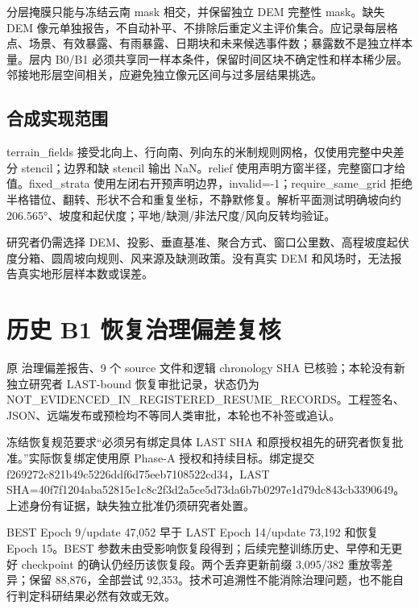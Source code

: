 \documentclass[UTF8,a4paper,10pt,fontset=fandol]{ctexart}
\begin{document}
分层掩膜只能与冻结云南 mask 相交，并保留独立 DEM 完整性 mask。缺失 DEM 像元单独报告，不自动补平、不排除后重定义主评价集合。应记录每层格点、场景、有效暴露、有雨暴露、日期块和未来候选事件数；暴露数不是独立样本量。层内 B0/B1 必须共享同一样本条件，保留时间区块不确定性和样本稀少层。邻接地形层空间相关，应避免独立像元区间与过多层结果挑选。\par

\subsection*{合成实现范围}

terrain\_fields 接受北向上、行向南、列向东的米制规则网格，仅使用完整中央差分 stencil；边界和缺 stencil 输出 NaN。relief 使用声明方窗半径，完整窗口才给值。fixed\_strata 使用左闭右开预声明边界，invalid=-1；require\_same\_grid 拒绝半格错位、翻转、形状不合和重复坐标，不静默修复。解析平面测试明确坡向约 206.565°、坡度和起伏度；平地/缺测/非法尺度/风向反转均验证。\par

研究者仍需选择 DEM、投影、垂直基准、聚合方式、窗口公里数、高程坡度起伏度分箱、圆周坡向规则、风来源及缺测政策。没有真实 DEM 和风场时，无法报告真实地形层样本数或误差。\par

\clearpage
\section*{历史 B1 恢复治理偏差复核}

原 治理偏差报告、9 个 source 文件和逻辑 chronology SHA 已核验；本轮没有新独立研究者 LAST-bound 恢复审批记录，状态仍为 NOT\_EVIDENCED\_IN\_REGISTERED\_RESUME\_RECORDS。工程签名、JSON、远端发布或预检均不等同人类审批，本轮也不补签或追认。\par

冻结恢复规范要求“必须另有绑定具体 LAST SHA 和原授权祖先的研究者恢复批准。”实际恢复绑定使用原 Phase-A 授权和持续目标。绑定提交 f269272c821b49c5226ddf6d75eeb7108522cd34，LAST SHA=40f7f1204aba52815e1c8c2f3d2a5ce5d73da6b7b0297e1d79dc843cb3390649。上述身份有证据，缺失独立批准仍须研究者处置。\par

BEST Epoch 9/update 47,052 早于 LAST Epoch 14/update 73,192 和恢复 Epoch 15。BEST 参数未由受影响恢复段得到；后续完整训练历史、早停和无更好 checkpoint 的确认仍经历该恢复段。两个丢弃更新前缀 3,095/382 重放零差异；保留 88,876，全部尝试 92,353。技术可追溯性不能消除治理问题，也不能自行判定科研结果必然有效或无效。\par
\end{document}
